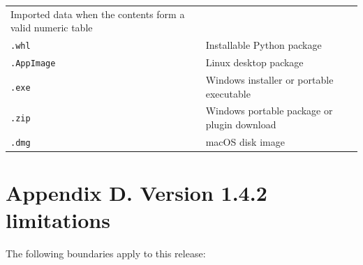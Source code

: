 \documentclass[
  10pt,
  a4paper,
  oneside]{scrreprt}
\begin{document}
\begin{longtable}[]{@{}ll@{}}
\begin{minipage}[t]{0.47\columnwidth}
Imported data when the contents form a valid numeric table\strut
\end{minipage}\tabularnewline
\begin{minipage}[t]{0.47\columnwidth}\raggedright
\texttt{.whl}\strut
\end{minipage} & \begin{minipage}[t]{0.47\columnwidth}\raggedright
Installable Python package\strut
\end{minipage}\tabularnewline
\begin{minipage}[t]{0.47\columnwidth}\raggedright
\texttt{.AppImage}\strut
\end{minipage} & \begin{minipage}[t]{0.47\columnwidth}\raggedright
Linux desktop package\strut
\end{minipage}\tabularnewline
\begin{minipage}[t]{0.47\columnwidth}\raggedright
\texttt{.exe}\strut
\end{minipage} & \begin{minipage}[t]{0.47\columnwidth}\raggedright
Windows installer or portable executable\strut
\end{minipage}\tabularnewline
\begin{minipage}[t]{0.47\columnwidth}\raggedright
\texttt{.zip}\strut
\end{minipage} & \begin{minipage}[t]{0.47\columnwidth}\raggedright
Windows portable package or plugin download\strut
\end{minipage}\tabularnewline
\begin{minipage}[t]{0.47\columnwidth}\raggedright
\texttt{.dmg}\strut
\end{minipage} & \begin{minipage}[t]{0.47\columnwidth}\raggedright
macOS disk image\strut
\end{minipage}\tabularnewline
\bottomrule
\end{longtable}

\hypertarget{appendix-d.-version-1.4.2-limitations}{%
\chapter{Appendix D. Version 1.4.2
limitations}\label{appendix-d.-version-1.4.2-limitations}}

The following boundaries apply to this release:
\end{document}
